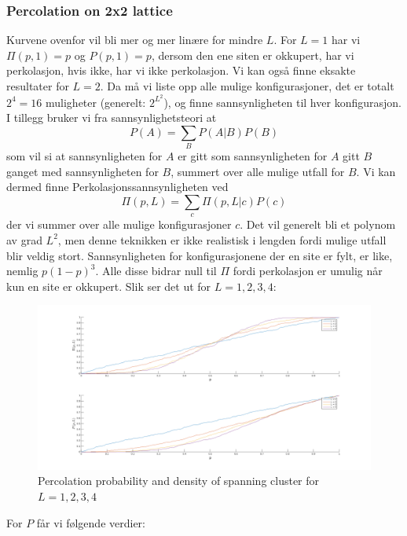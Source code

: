 \documentclass[english, a4paper]{article}
\begin{document}
\subsubsection{Percolation on 2x2 lattice}
Kurvene ovenfor vil bli mer og mer linære for mindre $L$. For $L=1$ har vi $\Pi(p,1) = p$ og $P(p,1) = p$,
dersom den ene siten er okkupert, har vi perkolasjon, hvis ikke, har vi ikke perkolasjon. 
Vi kan også finne eksakte resultater for $L=2$. Da må vi liste opp alle mulige konfigurasjoner,
det er totalt $2^4 = 16$ muligheter (generelt: $2^{L^2}$), og finne sannsynligheten til hver konfigurasjon. 
I tillegg bruker vi fra sannsynlighetsteori at
\begin{equation}
 P(A) = \sum_B P(A|B)P(B)
\end{equation}
som vil si at sannsynligheten for $A$ er gitt som sannsynligheten for $A$ gitt $B$ ganget med
sannsynligheten for $B$, summert over alle mulige utfall for $B$. Vi kan dermed finne
Perkolasjonssannsynligheten ved
\begin{equation}
 \Pi(p,L) = \sum_c \Pi(p,L|c)P(c)
\end{equation}
der vi summer over alle mulige konfigurasjoner $c$. Det vil generelt bli et polynom av grad $L^2$, men denne
teknikken er ikke realistisk i lengden fordi mulige utfall blir veldig stort. Sannsynligheten for
konfigurasjonene der en site er fylt, er like, nemlig $p(1-p)^3$. Alle disse bidrar null til $\Pi$ fordi
perkolasjon er umulig når kun en site er okkupert. 
Slik ser det ut for $L = 1,2,3,4$:
\begin{figure}[H]
  \begin{center}
  \includegraphics[width = 140mm]{../Figures/PiAndPL1234.png}
  \caption{Percolation probability and density of spanning cluster for $L=1,2,3,4$}
  \label{fig:fig8}
  \end{center}
\end{figure}
For $P$ får vi følgende verdier:
\end{document}
